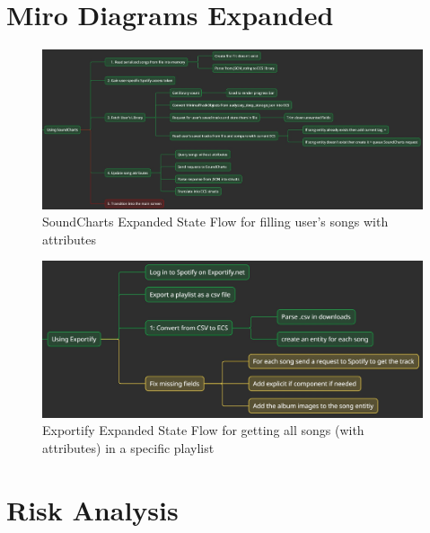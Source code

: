 \documentclass{src/ecsgdp}
\begin{document}
\chapter{Miro Diagrams Expanded} \label{appendix::Miro}
\begin{figure}
    \includegraphics[angle=90, scale=0.35]{Miro_SoundCharts_State_Flow.jpg}
    \caption{SoundCharts Expanded State Flow for filling user's songs with attributes}
\end{figure}

\begin{figure}
    \includegraphics[angle=90, scale=0.35]{Miro_Exportify_State_Flow.jpg}
    \caption{Exportify Expanded State Flow for getting all songs (with attributes) in a specific playlist}
\end{figure}

\chapter{Risk Analysis}%


%

\end{document}
